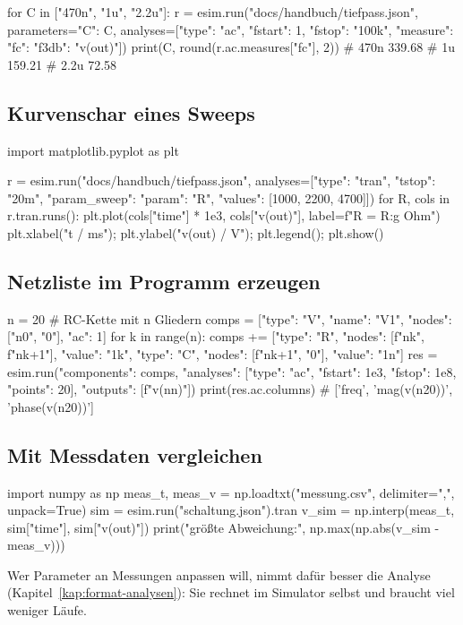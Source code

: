 \begin{python}
for C in ["470n", "1u", "2.2u"]:
    r = esim.run("docs/handbuch/tiefpass.json", parameters={"C": C},
                 analyses=[{"type": "ac", "fstart": 1, "fstop": "100k",
                            "measure": {"fc": {"f3db": "v(out)"}}}])
    print(C, round(r.ac.measures["fc"], 2))
# 470n 339.68
# 1u 159.21
# 2.2u 72.58
\end{python}

\subsection*{Kurvenschar eines Sweeps}

\begin{python}
import matplotlib.pyplot as plt

r = esim.run("docs/handbuch/tiefpass.json",
             analyses=[{"type": "tran", "tstop": "20m",
                        "param_sweep": {"param": "R", "values": [1000, 2200, 4700]}}])
for R, cols in r.tran.runs():
    plt.plot(cols["time"] * 1e3, cols["v(out)"], label=f"R = {R:g} Ohm")
plt.xlabel("t / ms"); plt.ylabel("v(out) / V"); plt.legend(); plt.show()
\end{python}

\subsection*{Netzliste im Programm erzeugen}

\begin{python}
n = 20                                   # RC-Kette mit n Gliedern
comps = [{"type": "V", "name": "V1", "nodes": ["n0", "0"], "ac": 1}]
for k in range(n):
    comps += [{"type": "R", "nodes": [f"n{k}", f"n{k+1}"], "value": "1k"},
              {"type": "C", "nodes": [f"n{k+1}", "0"], "value": "1n"}]
res = esim.run({"components": comps,
                "analyses": [{"type": "ac", "fstart": 1e3, "fstop": 1e8, "points": 20}],
                "outputs": [f"v(n{n})"]})
print(res.ac.columns)       # ['freq', 'mag(v(n20))', 'phase(v(n20))']
\end{python}

\subsection*{Mit Messdaten vergleichen}

\begin{python}
import numpy as np
meas_t, meas_v = np.loadtxt("messung.csv", delimiter=",", unpack=True)
sim = esim.run("schaltung.json").tran
v_sim = np.interp(meas_t, sim["time"], sim["v(out)"])
print("größte Abweichung:", np.max(np.abs(v_sim - meas_v)))
\end{python}

Wer Parameter an Messungen anpassen will, nimmt dafür besser die Analyse
 (Kapitel~\ref{kap:format-analysen}): Sie rechnet im Simulator
selbst und braucht viel weniger Läufe.
